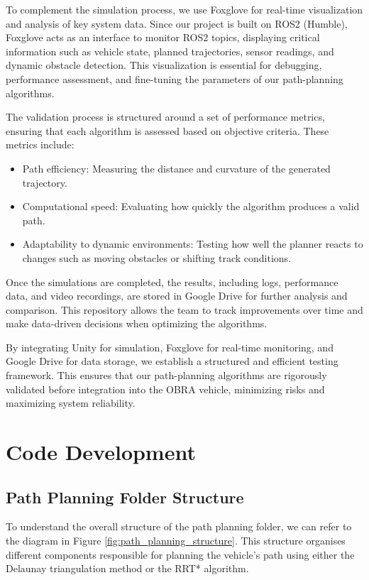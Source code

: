 \documentclass[a4paper,11pt]{report}
\begin{document}
To complement the simulation process, we use Foxglove for real-time visualization and analysis of key system data. Since our project is built on ROS2 (Humble), Foxglove acts as an interface to monitor ROS2 topics, displaying critical information such as vehicle state, planned trajectories, sensor readings, and dynamic obstacle detection. This visualization is essential for debugging, performance assessment, and fine-tuning the parameters of our path-planning algorithms.

The validation process is structured around a set of performance metrics, ensuring that each algorithm is assessed based on objective criteria. These metrics include:
\begin{itemize}
    \item Path efficiency: Measuring the distance and curvature of the generated trajectory.
    \item Computational speed: Evaluating how quickly the algorithm produces a valid path.
    \item Adaptability to dynamic environments: Testing how well the planner reacts to changes such as moving obstacles or shifting track conditions.
\end{itemize}

Once the simulations are completed, the results, including logs, performance data, and video recordings, are stored in Google Drive for further analysis and comparison. This repository allows the team to track improvements over time and make data-driven decisions when optimizing the algorithms.

By integrating Unity for simulation, Foxglove for real-time monitoring, and Google Drive for data storage, we establish a structured and efficient testing framework. This ensures that our path-planning algorithms are rigorously validated before integration into the OBRA vehicle, minimizing risks and maximizing system reliability.





\chapter{Code Development}

\section{Path Planning Folder Structure}

To understand the overall structure of the path planning folder, we can refer to the diagram in Figure \ref{fig:path_planning_structure}. This structure organises different components responsible for planning the vehicle's path using either the Delaunay triangulation method or the RRT* algorithm.
\end{document}
